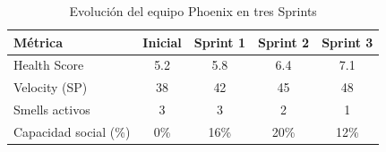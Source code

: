 \begin{table}[h]
    \centering
    \small
    \begin{tabularx}{\textwidth}{|X|c|c|c|c|}
        \hline
        \textbf{Métrica}      & \textbf{Inicial} & \textbf{Sprint 1} & \textbf{Sprint 2} & \textbf{Sprint 3} \\
        \hline
        Health Score          & 5.2              & 5.8               & 6.4               & 7.1               \\
        \hline
        Velocity (SP)         & 38               & 42                & 45                & 48                \\
        \hline
        Smells activos        & 3                & 3                 & 2                 & 1                 \\
        \hline
        Capacidad social (\%) & 0\%              & 16\%              & 20\%              & 12\%              \\
        \hline
    \end{tabularx}
    \caption{Evolución del equipo Phoenix en tres Sprints}
    \label{tab:evolucion-phoenix}
\end{table}
\FloatBarrier

